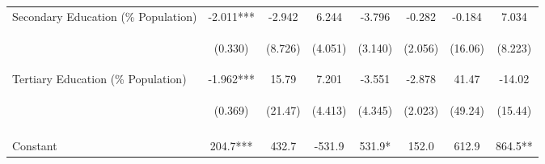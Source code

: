 \begin{subtables}
\begin{landscape}
\begin{table}[htpb!]
\begin{center}
\begin{tabular}{lccccccc}
Secondary Education (\% Population)	&	-2.011***	&	-2.942	&	6.244	&	-3.796	&	-0.282	&	-0.184	&	7.034	\\
	& \begin{footnotesize}	(0.330)	\end{footnotesize} & \begin{footnotesize}	(8.726)	\end{footnotesize} & \begin{footnotesize}	(4.051)	\end{footnotesize} & \begin{footnotesize}	(3.140)	\end{footnotesize} & \begin{footnotesize}	(2.056)	\end{footnotesize} & \begin{footnotesize}	(16.06)	\end{footnotesize} & \begin{footnotesize}	(8.223)	\end{footnotesize} \\
Tertiary Education (\% Population)	&	-1.962***	&	15.79	&	7.201	&	-3.551	&	-2.878	&	41.47	&	-14.02	\\
	& \begin{footnotesize}	(0.369)	\end{footnotesize} & \begin{footnotesize}	(21.47)	\end{footnotesize} & \begin{footnotesize}	(4.413)	\end{footnotesize} & \begin{footnotesize}	(4.345)	\end{footnotesize} & \begin{footnotesize}	(2.023)	\end{footnotesize} & \begin{footnotesize}	(49.24)	\end{footnotesize} & \begin{footnotesize}	(15.44)	\end{footnotesize} \\
& & & & & & & \\
Constant	&	204.7***	&	432.7	&	-531.9	&	531.9*	&	152.0	&	612.9	&	864.5**	\\

\end{tabular}
\end{center}
\end{table}
\end{landscape}
\end{subtables}
